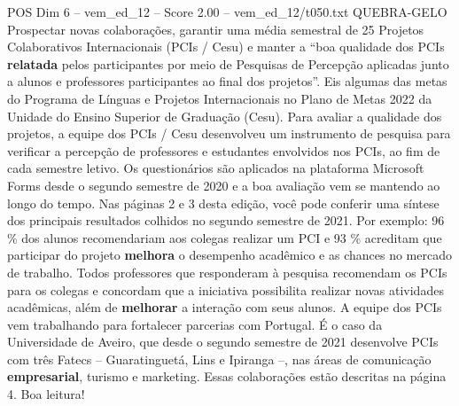 \begin{textsample}{POS Dim 6 – vem\_ed\_12 – Score 2.00 – vem\_ed\_12/t050.txt}  \label{ex:f6_pos_016}
QUEBRA-GELO Prospectar novas colaborações, garantir uma média semestral de 25 Projetos Colaborativos Internacionais (PCIs / Cesu) e manter a “boa qualidade dos PCIs \textbf{relatada} pelos participantes por meio de Pesquisas de Percepção aplicadas junto a alunos e professores participantes ao final dos projetos”.
Eis algumas das metas do Programa de Línguas e Projetos Internacionais no Plano de Metas 2022 da Unidade do Ensino Superior de Graduação (Cesu).
Para avaliar a qualidade dos projetos, a equipe dos PCIs / Cesu desenvolveu um instrumento de pesquisa para verificar a percepção de professores e estudantes envolvidos nos PCIs, ao fim de cada semestre letivo.
Os questionários são aplicados na plataforma Microsoft Forms desde o segundo semestre de 2020 e a boa avaliação vem se mantendo ao longo do tempo.
Nas páginas 2 e 3 desta edição, você pode conferir uma síntese dos principais resultados colhidos no segundo semestre de 2021.
Por exemplo: 96 \% dos alunos recomendariam aos colegas realizar um PCI e 93 \% acreditam que participar do projeto \textbf{melhora} o desempenho acadêmico e as chances no mercado de trabalho.
Todos professores que responderam à pesquisa recomendam os PCIs para os colegas e concordam que a iniciativa possibilita realizar novas atividades acadêmicas, além de \textbf{melhorar} a interação com seus alunos.
A equipe dos PCIs vem trabalhando para fortalecer parcerias com Portugal.
É o caso da Universidade de Aveiro, que desde o segundo semestre de 2021 desenvolve PCIs com três Fatecs – Guaratinguetá, Lins e Ipiranga –, nas áreas de comunicação \textbf{empresarial}, turismo e marketing.
Essas colaborações estão descritas na página 4.
Boa leitura!

\end{textsample}
